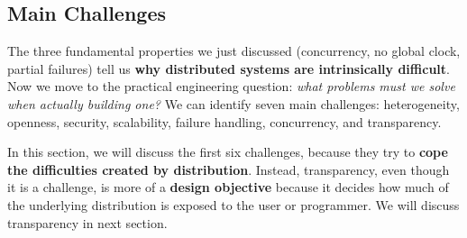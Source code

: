 \subsection{Main Challenges}\label{subsec:introduction--main-challenges}

The three fundamental properties we just discussed (concurrency, no global clock, partial failures) tell us \textbf{why distributed systems are intrinsically difficult}. Now we move to the practical engineering question: \emph{what problems must we solve when actually building one?} We can identify seven main challenges: heterogeneity, openness, security, scalability, failure handling, concurrency, and transparency.

\highspace
In this section, we will discuss the first six challenges, because they try to \textbf{cope the difficulties created by distribution}. Instead, transparency, even though it is a challenge, is more of a \textbf{design objective} because it decides how much of the underlying distribution is exposed to the user or programmer. We will discuss transparency in next section.

